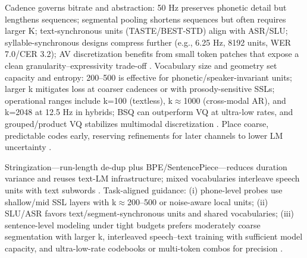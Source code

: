 \documentclass{article}
\begin{document}
Cadence governs bitrate and abstraction: 50 Hz preserves phonetic detail but lengthens sequences; segmental pooling shortens sequences but often requires larger K; text-synchronous units (TASTE/BEST-STD) align with ASR/SLU; syllable-synchronous designs compress further (e.g., 6.25 Hz, 8192 units, WER 7.0/CER 3.2); AV discretization benefits from small token patches that expose a clean granularity--expressivity trade-off \cite{kando2025exploringeffectsegmentationvocabularysiz,tseng2025tastetextalignedspeechtokenizationembedd,baade2024syllablelmlearningcoarsesemanticunitsspe,sadok2025vectorquantizedmaskedautoencoderaudiovis}. Vocabulary size and geometry set capacity and entropy: 200--500 is effective for phonetic/speaker-invariant units; larger k mitigates loss at coarser cadences or with prosody-sensitive SSLs; operational ranges include k=100 (textless), k$\approx$1000 (cross-modal AR), and k=2048 at 12.5 Hz in hybrids; BSQ can outperform VQ at ultra-low rates, and grouped/product VQ stabilizes multimodal discretization \cite{chang2024dcspinspeakerinvariantspeechtokenizerspo,onda2025benchmarkingprosodyencodingdiscretespeec,hsu2024exploringcontextlearningtextlessspeechla,wu2024speechcomposerunifyingmultiplespeechtask,yang2025diffsoundstreamefficientspeechtokenizati,wang2025tadicodectextawarediffusionspeechtokeniz,sadok2025vectorquantizedmaskedautoencoderaudiovis}. Place coarse, predictable codes early, reserving refinements for later channels to lower LM uncertainty \cite{guo2025recentadvancesdiscretespeechtokensreview}.

Stringization---run-length de-dup plus BPE/SentencePiece---reduces duration variance and reuses text-LM infrastructure; mixed vocabularies interleave speech units with text subwords \cite{guo2025recentadvancesdiscretespeechtokensreview,wu2024speechcomposerunifyingmultiplespeechtask,hsu2024exploringcontextlearningtextlessspeechla}. Task-aligned guidance: (i) phone-level probes use shallow/mid SSL layers with k$\approx$200--500 or noise-aware local units; (ii) SLU/ASR favors text/segment-synchronous units and shared vocabularies; (iii) sentence-level modeling under tight budgets prefers moderately coarse segmentation with larger k, interleaved speech--text training with sufficient model capacity, and ultra-low-rate codebooks or multi-token combos for precision \cite{visser2025spokenlanguagemodelingdurationpenalizeds,gong2025xytokenizermitigatingsemanticacousticcon,kando2025exploringeffectsegmentationvocabularysiz,maimon2025scalinganalysisinterleavedspeechtextlang,zhang2025impactframeratesspeechtokenizercasestudy}.
\end{document}
